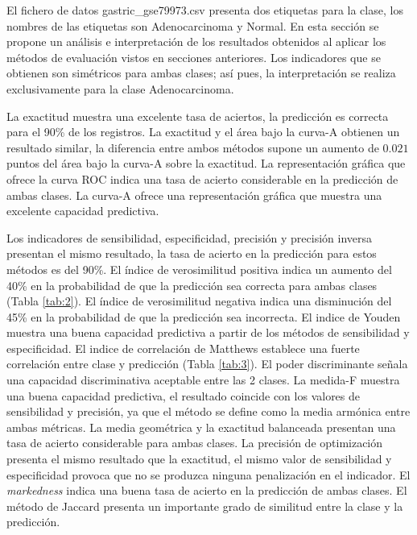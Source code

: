 \bigbreak

El fichero de datos gastric\_gse79973.csv presenta dos etiquetas para la clase, los nombres de las etiquetas son Adenocarcinoma y Normal. En esta sección se propone un análisis e interpretación de los resultados obtenidos al aplicar los métodos de evaluación vistos en secciones anteriores. Los indicadores que se obtienen son simétricos para ambas clases; así pues, la interpretación se realiza exclusivamente para la clase Adenocarcinoma.

\bigbreak

La exactitud muestra una excelente tasa de aciertos, la predicción es correcta para el 90\% de los registros. La exactitud y el área bajo la curva-A obtienen un resultado similar, la diferencia entre ambos métodos supone un aumento de $0.021$ puntos del área bajo la curva-A sobre la exactitud. La representación gráfica que ofrece la curva ROC indica una tasa de acierto considerable en la predicción de ambas clases. La curva-A ofrece una representación gráfica que muestra una excelente capacidad predictiva.

\bigbreak

Los indicadores de sensibilidad, especificidad, precisión y precisión inversa presentan el mismo resultado, la tasa de acierto en la predicción para estos métodos es del 90\%. El índice de verosimilitud positiva indica un aumento del 40\% en la probabilidad de que la predicción sea correcta para ambas clases (Tabla \ref{tab:2}). El índice de verosimilitud negativa indica una disminución del 45\% en la probabilidad de que la predicción sea incorrecta. El indice de Youden muestra una buena capacidad predictiva a partir de los métodos de sensibilidad y especificidad. El indice de correlación de Matthews establece una fuerte correlación entre clase y predicción (Tabla \ref{tab:3}). El poder discriminante señala una capacidad discriminativa aceptable entre las 2 clases. La medida-F muestra una buena capacidad predictiva, el resultado coincide con los valores de sensibilidad y precisión, ya que el método se define como la media armónica entre ambas métricas. La media geométrica y la exactitud balanceada presentan una tasa de acierto considerable para ambas clases. La precisión de optimización presenta el mismo resultado que la exactitud, el mismo valor de sensibilidad y especificidad provoca que no se produzca ninguna penalización en el indicador. El \textit{markedness} indica una buena tasa de acierto en la predicción de ambas clases. El método de Jaccard presenta un importante grado de similitud entre la clase y la predicción.

